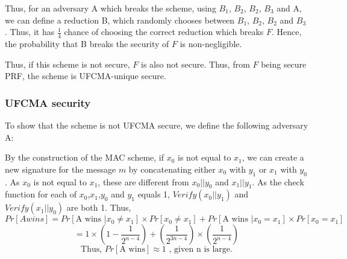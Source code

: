 \documentclass{article}
\begin{document}
Thus, for an adversary A which breaks the scheme, using $B_1$, $B_2$, $B_2$, $B_3$ and A, we can define a reduction B, which randomly chooses between $B_1$, $B_2$, $B_2$ and $B_3$. Thus, it has $\frac{1}{4}$ chance of choosing the correct reduction which breaks $F$. Hence, the probability that B breaks the security of $F$ is non-negligible.

Thus, if this scheme is not secure, $F$ is also not secure. Thus, from $F$ being secure PRF, the scheme is UFCMA-unique secure.

\subsubsection{UFCMA security}
To show that the scheme is not UFCMA secure, we define the following adversary A:
\begin{figure}[H]
    \centering
{}
\end{figure}
By the construction of the MAC scheme, if $x_0$ is not equal to $x_1$, we can create a new signature for the message $m$ by concatenating either $x_0$ with $y_1$ or $x_1$ with $y_0$. As $x_0$ is not equal to $x_1$, these are different from $x_0||y_0$ and $x_1||y_1$. As the check function for each of $x_0$,$x_1$,$y_0$ and $y_1$ equals 1, $Verify(x_0||y_1)$ and $Verify(x_1||y_0)$ are both 1. Thus,
\[Pr[A wins]=Pr[\text{A wins }| x_0\neq x_1]\times Pr[x_0\neq x_1] + Pr[\text{A wins }|x_0=x_1]\times Pr[x_0=x_1]\]
\[=1\times(1-\frac{1}{2^{n-4}})+(\frac{1}{2^{3n-4}})\times(\frac{1}{2^{n-4}})\]
\[\text{Thus, }Pr[\text{A wins}]\approx 1\text{ , given n is large.}\]
\newpage
\end{document}
